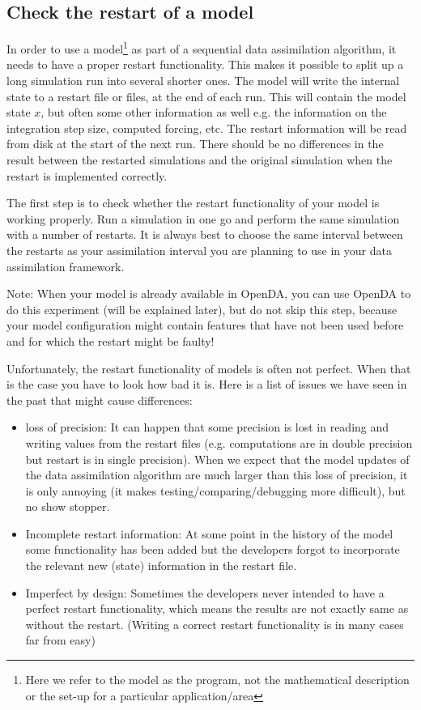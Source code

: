 \documentclass[a4paper,10pt]{article}
\begin{document}
\subsection{Check the restart of a model}
In order to use a model\footnote{Here we refer to the model as the program, not the mathematical description or the set-up for a particular application/area} as part of a sequential data assimilation algorithm, it needs to have a proper restart functionality. This makes it possible to split up a long simulation run into several shorter ones. The model will write the internal state to a restart file or files, at the end of each run. This will contain the model state $x$, but often some other information as well e.g. the information on the integration step size, computed forcing, etc. The restart information will be read from disk at the start of the next run. There should be no differences in the result between the restarted simulations and the original simulation when the restart is implemented correctly. 

The first step is to check whether the restart functionality of your model is working properly. Run a simulation in one go and perform the same simulation with a number of restarts. It is always best to choose the same interval between the restarts as your assimilation interval you are planning to use in your data assimilation framework.

Note: When your model is already available in OpenDA, you can use OpenDA to do this experiment (will be explained later), but do not skip this step, because your model configuration might contain features that have not been used before and for which the restart might be faulty!


Unfortunately, the restart functionality of models is often not perfect. When that is the case you have to look how bad it is. Here is a list of issues we have seen in the past that might cause differences:
\begin{itemize}
\item loss of precision: It can happen that some precision is lost in reading and writing values from the restart files (e.g. computations are in double precision but restart is in single precision). When we expect that the model updates of the data assimilation algorithm are much larger than this loss of precision, it is only annoying (it makes testing/comparing/debugging more difficult), but no show stopper.
\item Incomplete restart information: At some point in the history of the model some functionality has been added but the developers forgot to incorporate the relevant new (state) information in the restart file.
\item Imperfect by design: Sometimes the developers never intended to have a perfect restart functionality, which means the results are not exactly same as without the restart. (Writing a correct restart functionality is in many cases far from easy)
\end{itemize}
\end{document}
